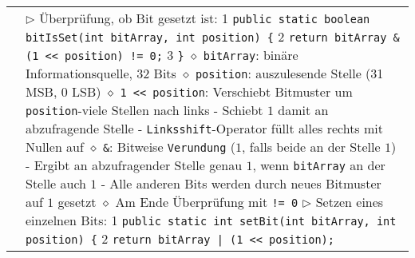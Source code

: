 \begin{longtable}{ | p{} p{} | }
	\makecell[l]{Bitlogik} & \makecell[l]{
	$\rhd$ Überprüfung, ob Bit gesetzt ist: \\
	\hspace{0.4cm} 1 \hspace{0.1cm} \texttt{public static boolean bitIsSet(int bitArray, int position) \{} \\
	\hspace{0.4cm} 2 \hspace{0.5cm} \texttt{return bitArray \& (1 << position) != 0;} \\
	\hspace{0.4cm} 3 \hspace{0.1cm} \texttt{\}} \\
	\hspace{0.4cm} $\diamond$ \texttt{bitArray}: binäre Informationsquelle, 32 Bits \\
	\hspace{0.4cm} $\diamond$ \texttt{position}: auszulesende Stelle (31 MSB, 0 LSB) \\
	\hspace{0.4cm} $\diamond$ \texttt{1 << position}: Verschiebt Bitmuster um \texttt{position}-viele Stellen nach links \\
	\hspace{0.6cm} - Schiebt $1$ damit an abzufragende Stelle \\
	\hspace{0.6cm} - \texttt{Linksshift}-Operator füllt alles rechts mit Nullen auf \\
	\hspace{0.4cm} $\diamond$ \texttt{\&}: Bitweise \texttt{Verundung} ($1$, falls beide an der Stelle $1$) \\
	\hspace{0.6cm} - Ergibt an abzufragender Stelle genau $1$, wenn \texttt{bitArray} an der Stelle auch $1$ \\
	\hspace{0.6cm} - Alle anderen Bits werden durch neues Bitmuster auf $1$ gesetzt  \\
	\hspace{0.4cm} $\diamond$ Am Ende Überprüfung mit \texttt{!= 0} \\
	$\rhd$ Setzen eines einzelnen Bits: \\
	\hspace{0.4cm} 1 \hspace{0.1cm} \texttt{public static int setBit(int bitArray, int position) \{} \\
	\hspace{0.4cm} 2 \hspace{0.5cm} \texttt{return bitArray | (1 << position);} \\
}
\end{longtable}
